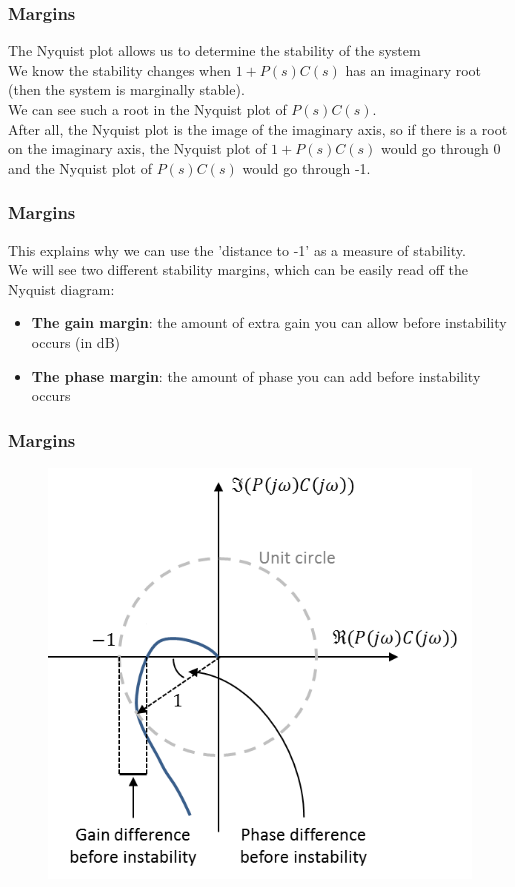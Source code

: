 \begin{frame}
	\frametitle{Margins}
	\vspace{-6ex}
	The Nyquist plot allows us to determine the stability of the system\\
	We know the stability changes when $1+P(s)C(s)$ has an imaginary root (then the system is marginally stable).\\
	\medskip
	We can see such a root in the Nyquist plot of $P(s)C(s)$.\\ After all, the Nyquist plot is the image of the imaginary axis, so if there is a root on the imaginary axis, the Nyquist plot of $1+P(s)C(s)$ would go through 0 and the Nyquist plot of $P(s)C(s)$ would go through -1.
\end{frame}

\begin{frame}
	\frametitle{Margins}
	\vspace{-6ex}
	This explains why we can use the 'distance to -1' as a measure of stability.\\
	\medskip
	We will see two different stability margins, which can be easily read off the Nyquist diagram:
	\begin{itemize}
		\item \textbf{The gain margin}: the amount of extra gain you can allow before instability occurs (in dB)
		\item \textbf{The phase margin}: the amount of phase you can add before instability occurs
	\end{itemize}
\end{frame}

\begin{frame}
	\frametitle{Margins}
	\begin{figure}
		\includegraphics[width=0.6\linewidth]{margins}
	\end{figure}
\end{frame}


